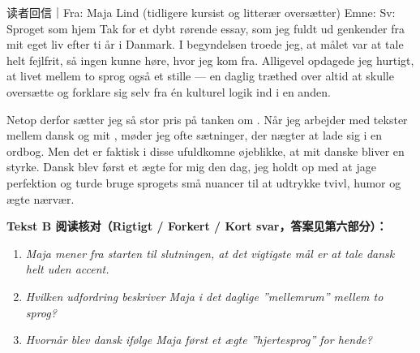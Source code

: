 \begin{emailbox}{读者回信｜Fra: Maja Lind (tidligere kursist og litterær oversætter) \quad Emne: Sv: Sproget som hjem}
Tak for et dybt rørende essay, som jeg fuldt ud genkender fra mit eget liv efter ti år i Danmark. I begyndelsen troede jeg, at målet var at tale helt fejlfrit, så ingen kunne høre, hvor jeg kom fra. Alligevel opdagede jeg hurtigt, at livet mellem to sprog også  et stille  --- en daglig træthed over altid at skulle oversætte og forklare sig selv fra én kulturel logik ind i en anden.

Netop derfor sætter jeg så stor pris på tanken om . Når jeg arbejder med tekster mellem dansk og mit , møder jeg ofte sætninger, der nægter at lade sig  i en ordbog. Men det er faktisk i disse ufuldkomne øjeblikke, at mit danske  bliver en styrke. Dansk blev først et ægte  for mig den dag, jeg holdt op med at jage perfektion og turde bruge sprogets små nuancer til at udtrykke tvivl, humor og ægte nærvær.
\end{emailbox}

\textbf{Tekst B 阅读核对（Rigtigt / Forkert / Kort svar，答案见第六部分）：}
\begin{enumerate}
  \item \textit{Maja mener fra starten til slutningen, at det vigtigste mål er at tale dansk helt uden accent.} \underline{\hspace{2.2cm}}
  \item \textit{Hvilken udfordring beskriver Maja i det daglige ”mellemrum” mellem to sprog?} \underline{\hspace{2.2cm}}
  \item \textit{Hvornår blev dansk ifølge Maja først et ægte ”hjertesprog” for hende?} \underline{\hspace{2.2cm}}
\end{enumerate}

